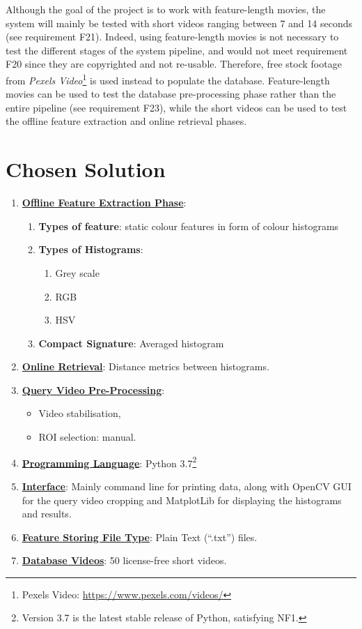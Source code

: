 Although the goal of the project is to work with feature-length movies, the system will mainly be tested with short videos ranging between 7 and 14 seconds (see requirement F21). Indeed, using feature-length movies is not necessary to test the different stages of the system pipeline, and would not meet requirement F20 since they are copyrighted and not re-usable. Therefore, free stock footage from \textit{Pexels Video}\footnote{Pexels Video: \url{https://www.pexels.com/videos/}} is used instead to populate the database. Feature-length movies can be used to test the database pre-processing phase rather than the entire pipeline (see requirement F23), while the short videos can be used to test the offline feature extraction and online retrieval phases.

\section{Chosen Solution}

\begin{enumerate}
    \item \underline{\textbf{Offline Feature Extraction Phase}}:
    \begin{enumerate}
        \item \textbf{Types of feature}: static colour features in form of colour histograms
        \item \textbf{Types of Histograms}:
        \begin{enumerate}
            \item Grey scale
            \item RGB
            \item HSV
        \end{enumerate}
        \item \textbf{Compact Signature}: Averaged histogram
    \end{enumerate}
    \item \underline{\textbf{Online Retrieval}}: Distance metrics between histograms.
    \item \underline{\textbf{Query Video Pre-Processing}}: 
    \begin{itemize}
        \item Video stabilisation,
        \item ROI selection: manual.
    \end{itemize}
    \item \underline{\textbf{Programming Language}}: Python 3.7\footnote{Version 3.7 is the latest stable release of Python, satisfying NF1.}
    \item \underline{\textbf{Interface}}: Mainly command line for printing data, along with OpenCV GUI for the query video cropping and MatplotLib for displaying the histograms and results.
    \item \underline{\textbf{Feature Storing File Type}}: Plain Text (``.txt'') files.
    \item \underline{\textbf{Database Videos}}: 50 license-free short videos.
\end{enumerate}

